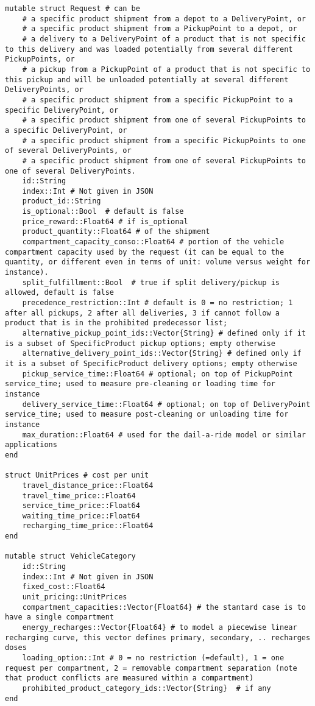 \documentclass[12pt,a4paper]{article}
\begin{document}
\begin{verbatim}
mutable struct Request # can be
    # a specific product shipment from a depot to a DeliveryPoint, or
    # a specific product shipment from a PickupPoint to a depot, or
    # a delivery to a DeliveryPoint of a product that is not specific to this delivery and was loaded potentially from several different PickupPoints, or
    # a pickup from a PickupPoint of a product that is not specific to this pickup and will be unloaded potentially at several different DeliveryPoints, or
    # a specific product shipment from a specific PickupPoint to a specific DeliveryPoint, or
    # a specific product shipment from one of several PickupPoints to a specific DeliveryPoint, or
    # a specific product shipment from a specific PickupPoints to one of several DeliveryPoints, or
    # a specific product shipment from one of several PickupPoints to one of several DeliveryPoints.
    id::String
    index::Int # Not given in JSON
    product_id::String  
    is_optional::Bool  # default is false
    price_reward::Float64 # if is_optional
    product_quantity::Float64 # of the shipment
    compartment_capacity_conso::Float64 # portion of the vehicle compartment capacity used by the request (it can be equal to the quantity, or different even in terms of unit: volume versus weight for instance).
    split_fulfillment::Bool  # true if split delivery/pickup is allowed, default is false
    precedence_restriction::Int # default is 0 = no restriction; 1 after all pickups, 2 after all deliveries, 3 if cannot follow a product that is in the prohibited predecessor list; 
    alternative_pickup_point_ids::Vector{String} # defined only if it is a subset of SpecificProduct pickup options; empty otherwise
    alternative_delivery_point_ids::Vector{String} # defined only if it is a subset of SpecificProduct delivery options; empty otherwise
    pickup_service_time::Float64 # optional; on top of PickupPoint service_time; used to measure pre-cleaning or loading time for instance
    delivery_service_time::Float64 # optional; on top of DeliveryPoint service_time; used to measure post-cleaning or unloading time for instance
    max_duration::Float64 # used for the dail-a-ride model or similar applications
end

struct UnitPrices # cost per unit
    travel_distance_price::Float64
    travel_time_price::Float64
    service_time_price::Float64
    waiting_time_price::Float64
    recharging_time_price::Float64
end

mutable struct VehicleCategory
    id::String
    index::Int # Not given in JSON
    fixed_cost::Float64
    unit_pricing::UnitPrices
    compartment_capacities::Vector{Float64} # the stantard case is to have a single compartment
    energy_recharges::Vector{Float64} # to model a piecewise linear recharging curve, this vector defines primary, secondary, .. recharges doses
    loading_option::Int # 0 = no restriction (=default), 1 = one request per compartment, 2 = removable compartment separation (note that product conflicts are measured within a compartment)
    prohibited_product_category_ids::Vector{String}  # if any
end


\end{verbatim}
\end{document}
